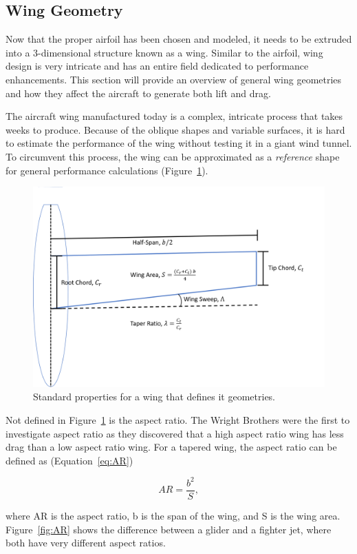 \subsection{Wing Geometry}
Now that the proper airfoil has been chosen and modeled, it needs to be extruded into a 3-dimensional structure known as a wing. Similar to the airfoil, wing design is very intricate and has an entire field dedicated to performance enhancements. This section will provide an overview of general wing geometries and how they affect the aircraft to generate both lift and drag.

The aircraft wing manufactured today is a complex, intricate process that takes weeks to produce. Because of the oblique shapes and variable surfaces, it is hard to estimate the performance of the wing without testing it in a giant wind tunnel. To circumvent this process, the wing can be approximated as a \textit{reference} shape for general performance calculations (Figure~\ref{fig:winggeometry}).

\begin{figure}[!ht]\label{fig:winggeometry}
    \centering
    \includegraphics[width=.75\linewidth]{Figures/Winggeometry.png}
    \caption{Standard properties for a wing that defines it geometries.}
\end{figure}

Not defined in Figure~\ref{fig:winggeometry} is the aspect ratio. The Wright Brothers were the first to investigate aspect ratio as they discovered that a high aspect ratio wing has less drag than a low aspect ratio wing. For a tapered wing, the aspect ratio can be defined as (Equation~\ref{eq:AR})

\begin{equation}\label{eq:AR}
    AR = \frac{b^2}{S},
\end{equation}

where AR is the aspect ratio, b is the span of the wing, and S is the wing area. Figure~\ref{fig:AR} shows the difference between a glider and a fighter jet, where both have very different aspect ratios.

